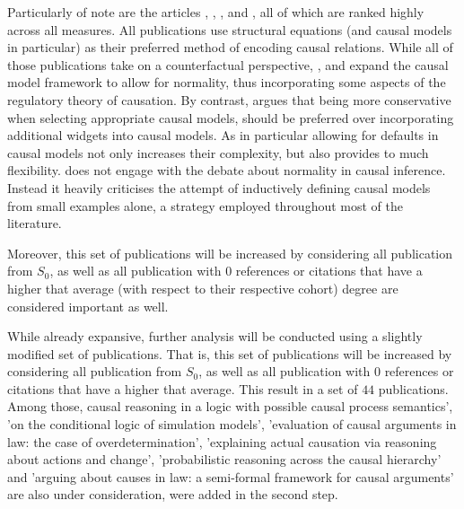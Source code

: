 \documentclass[11pt,a4paper]{book}
\theoremstyle{definition}
\theoremstyle{definition}
\theoremstyle{definition}
\theoremstyle{remark}
\newcommand{\psetz}{S_{\mathit{0}}}
\begin{document}
Particularly of note are the articles \cite{weslake2015partial}, \cite{blanchard2017cause}, \cite{halpern2011actual}, \cite{glymour2010actual} and \cite{halpern2015graded}, all of which are ranked highly across all measures. 
All publications use structural equations (and causal models in particular) as their preferred method of encoding causal relations.  
While all of those publications take on a counterfactual perspective, \parencite{halpern2011actual}, \parencite{weslake2015partial} and \parencite{halpern2015graded} expand the causal model framework to allow for normality, thus incorporating some aspects of the regulatory theory of causation.
By contrast, \parencite{blanchard2017cause} argues that being more conservative when selecting appropriate causal models, should be preferred over incorporating additional widgets into causal models.
As in particular allowing for defaults in causal models not only increases their complexity, but also provides to much flexibility. 
\parencite{glymour2010actual} does not engage with the debate about normality in causal inference. Instead it heavily criticises the attempt of inductively defining causal models from small examples alone, a strategy employed  throughout most of the literature.


Moreover, this set of publications will be increased by considering all publication from $\psetz$, as well as all publication with $0$ references or citations that have a higher that average (with respect to their respective cohort) degree are considered important as well.


While already expansive, further analysis will be conducted using a slightly modified set of publications. That is, this set of publications will be increased by considering all publication from $\psetz$, as well as all publication with $0$ references or citations that have a higher that average. 
This result in a set of $44$ publications. Among those, causal reasoning in a logic with possible causal process semantics', 'on the conditional logic of simulation models', 'evaluation of causal arguments in law: the case of overdetermination', 'explaining actual causation via reasoning about actions and change', 'probabilistic reasoning across the causal hierarchy' and 'arguing about causes in law: a semi-formal framework for causal arguments' are also under consideration, were added in the second step. 
\end{document}
